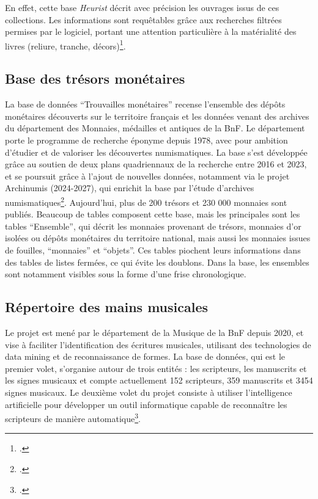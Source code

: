 En effet, cette base \emph{Heurist} décrit avec précision les ouvrages issus de ces collections. Les informations sont requêtables grâce aux recherches filtrées permises par le logiciel, portant une attention particulière à la matérialité des livres (reliure, tranche, décors)\footcite{noauthor_collection_nodate}. 


\subsection{Base des trésors monétaires}

La base de données \enquote{Trouvailles monétaires} recense l'ensemble des dépôts monétaires découverts sur le territoire français et les données venant des archives du département des Monnaies, médailles et antiques de la BnF. Le département porte le programme de recherche éponyme depuis 1978, avec pour ambition d'étudier et de valoriser les découvertes numismatiques. La base s'est développée grâce au soutien de deux plans quadriennaux de la recherche entre 2016 et 2023, et se poursuit grâce à l'ajout de nouvelles données, notamment via le projet Archinumis (2024-2027), qui enrichit la base par l'étude d'archives numismatiques\footcite{noauthor_base_nodate}. Aujourd'hui, plus de 200 trésors et 230 000 monnaies sont publiés. 
Beaucoup de tables composent cette base, mais les principales sont les tables \enquote{Ensemble}, qui décrit les monnaies provenant de trésors, monnaies d'or isolées ou dépôts monétaires du territoire national, mais aussi les monnaies issues de fouilles, \enquote{monnaies} et \enquote{objets}. Ces tables piochent leurs informations dans des tables de listes fermées, ce qui évite les doublons. Dans la base, les ensembles sont notamment visibles sous la forme d'une frise chronologique. 

\subsection{Répertoire des mains musicales}

Le projet est mené par le département de la Musique de la BnF depuis 2020, et vise à faciliter l'identification des écritures musicales, utilisant des technologies de data mining et de reconnaissance de formes. La base de données, qui est le premier volet, s'organise autour de trois entités : les scripteurs, les manuscrits et les signes musicaux et compte actuellement 152 scripteurs, 359 manuscrits et 3454 signes musicaux. Le deuxième volet du projet consiste à utiliser l'intelligence artificielle pour développer un outil informatique capable de reconnaître les scripteurs de manière automatique\footcite{noauthor_repertoire_nodate}. 
 